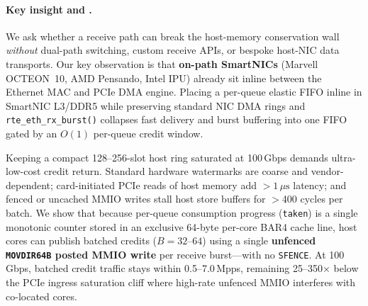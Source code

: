 \paragraph{Key insight and \sys{}.}
We ask whether a receive path can break the host-memory conservation wall
\emph{without} dual-path switching, custom receive APIs, or bespoke host-NIC
data transports. Our key observation is that \textbf{on-path SmartNICs}
(Marvell OCTEON~10, AMD Pensando, Intel IPU) already sit inline between the
Ethernet MAC and PCIe DMA engine. Placing a per-queue elastic FIFO inline in
SmartNIC L3/DDR5 while preserving standard NIC DMA rings and
\texttt{rte\_eth\_rx\_burst()} collapses fast delivery and burst buffering into
one FIFO gated by an $O(1)$ per-queue credit window.

Keeping a compact 128--256-slot host ring saturated at 100\,Gbps demands
ultra-low-cost credit return. Standard hardware watermarks are coarse and
vendor-dependent; card-initiated PCIe reads of host memory add $>1\,\mu\text{s}$
latency; and fenced or uncached MMIO writes stall host store buffers for
$>$400 cycles per batch. We show that because per-queue consumption progress
(\texttt{taken}) is a single monotonic counter stored in an exclusive 64-byte
per-core BAR4 cache line, host cores can publish batched credits ($B=32$--$64$)
using a single \textbf{unfenced \texttt{MOVDIR64B} posted MMIO write} per
receive burst---with no \texttt{SFENCE}. At 100\,Gbps, batched credit traffic
stays within 0.5--7.0\,Mpps, remaining 25--350$\times$ below the PCIe ingress
saturation cliff where high-rate unfenced MMIO interferes with co-located cores.


